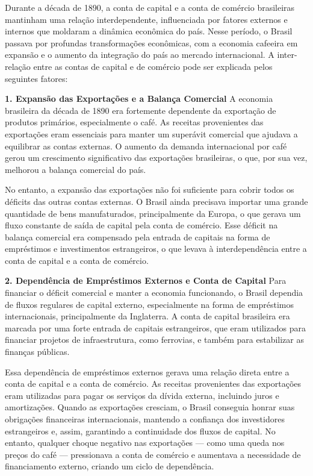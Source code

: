 \documentclass[a4paper,12pt]{article}[abntex2]
\begin{document}
Durante a década de 1890, a conta de capital e a conta de comércio brasileiras mantinham uma relação interdependente, influenciada por fatores externos e internos que moldaram a dinâmica econômica do país. Nesse período, o Brasil passava por profundas transformações econômicas, com a economia cafeeira em expansão e o aumento da integração do país ao mercado internacional. A inter-relação entre as contas de capital e de comércio pode ser explicada pelos seguintes fatores:

\textbf{1. Expansão das Exportações e a Balança Comercial}
A economia brasileira da década de 1890 era fortemente dependente da exportação de produtos primários, especialmente o café. As receitas provenientes das exportações eram essenciais para manter um superávit comercial que ajudava a equilibrar as contas externas. O aumento da demanda internacional por café gerou um crescimento significativo das exportações brasileiras, o que, por sua vez, melhorou a balança comercial do país.

No entanto, a expansão das exportações não foi suficiente para cobrir todos os déficits das outras contas externas. O Brasil ainda precisava importar uma grande quantidade de bens manufaturados, principalmente da Europa, o que gerava um fluxo constante de saída de capital pela conta de comércio. Esse déficit na balança comercial era compensado pela entrada de capitais na forma de empréstimos e investimentos estrangeiros, o que levava à interdependência entre a conta de capital e a conta de comércio.

\textbf{2. Dependência de Empréstimos Externos e Conta de Capital}
Para financiar o déficit comercial e manter a economia funcionando, o Brasil dependia de fluxos regulares de capital externo, especialmente na forma de empréstimos internacionais, principalmente da Inglaterra. A conta de capital brasileira era marcada por uma forte entrada de capitais estrangeiros, que eram utilizados para financiar projetos de infraestrutura, como ferrovias, e também para estabilizar as finanças públicas.

Essa dependência de empréstimos externos gerava uma relação direta entre a conta de capital e a conta de comércio. As receitas provenientes das exportações eram utilizadas para pagar os serviços da dívida externa, incluindo juros e amortizações. Quando as exportações cresciam, o Brasil conseguia honrar suas obrigações financeiras internacionais, mantendo a confiança dos investidores estrangeiros e, assim, garantindo a continuidade dos fluxos de capital. No entanto, qualquer choque negativo nas exportações — como uma queda nos preços do café — pressionava a conta de comércio e aumentava a necessidade de financiamento externo, criando um ciclo de dependência.
\end{document}
